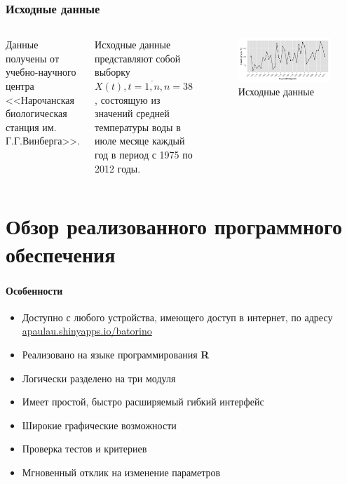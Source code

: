 \documentclass[notheorems]{beamer}
\theoremstyle{definition}
\theoremstyle{example}
\theoremstyle{plain}
\begin{document}
\begin{frame}
  \frametitle{Исходные данные}
  \begin{columns}[c]
  \column{2in}
  Данные получены от учебно-научного центра <<Нарочанская биологическая станция им. Г.Г.Винберга>>.

  \vspace{0.5em}

  Исходные данные представляют собой выборку $ X(t), t = \overline{1,n}, n = 38 $, состоящую из значений средней температуры воды в июле месяце каждый год в период с 1975 по 2012 годы.
  \column{4in}
  \begin{figure}[h]
    \includegraphics[width=1\linewidth]{../../figures/source.png}
    \caption{Исходные данные}
  \end{figure}
  \end{columns}
\end{frame}

\section{Обзор реализованного программного обеспечения}

\begin{frame}
  \frametitle{\large\secname}
  \framesubtitle{Особенности}
  \begin{itemize}
    \item Доступно с любого устройства, имеющего доступ в интернет, по адресу \href{https://apaulau.shinyapps.io/batorino}{apaulau.shinyapps.io/batorino}
    \item Реализовано на языке программирования \textbf{R}
    \item Логически разделено на три модуля
    \item Имеет простой, быстро расширяемый гибкий интерфейс
    \item Широкие графические возможности
    \item Проверка тестов и критериев
    \item Мгновенный отклик на изменение параметров
  \end{itemize}
\end{frame}
\end{document}
